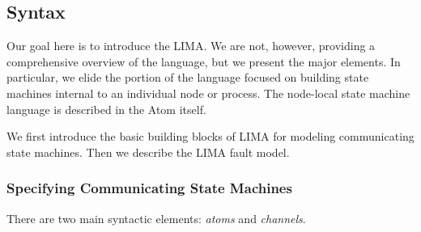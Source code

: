 \subsection{Syntax}\label{ssec:lima-syntax}


Our goal here is to introduce the LIMA. We are not, however, providing a comprehensive overview of the language, but we present the major elements. In particular, we elide the portion
of the language focused on building state machines internal to an
individual node or process. The node-local state machine language is described in the Atom itself.

We first introduce the basic building blocks of LIMA for modeling communicating state machines. Then we describe the LIMA fault model.

\subsubsection{Specifying Communicating State Machines}\label{sec:syntax}

There are
two main syntactic elements: \emph{atoms} and \emph{channels}.


